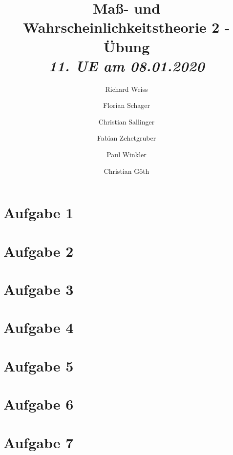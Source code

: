 \documentclass{article}
\title
{
  Maß- und Wahrscheinlichkeitstheorie 2 - Übung \\
  \vspace{4pt}
  \normalsize
  \textit{11. UE am 08.01.2020}
}
\author
{
  Richard Weiss       \and
  Florian Schager     \and
  Christian Sallinger \and
  Fabian Zehetgruber  \and
  Paul Winkler        \and
  Christian Göth
}
\date{}
\begin{document}
\maketitle

\section*{Aufgabe 1}


\section*{Aufgabe 2}


\section*{Aufgabe 3}


\section*{Aufgabe 4}


\section*{Aufgabe 5}


\section*{Aufgabe 6}


\section*{Aufgabe 7}

\end{document}

